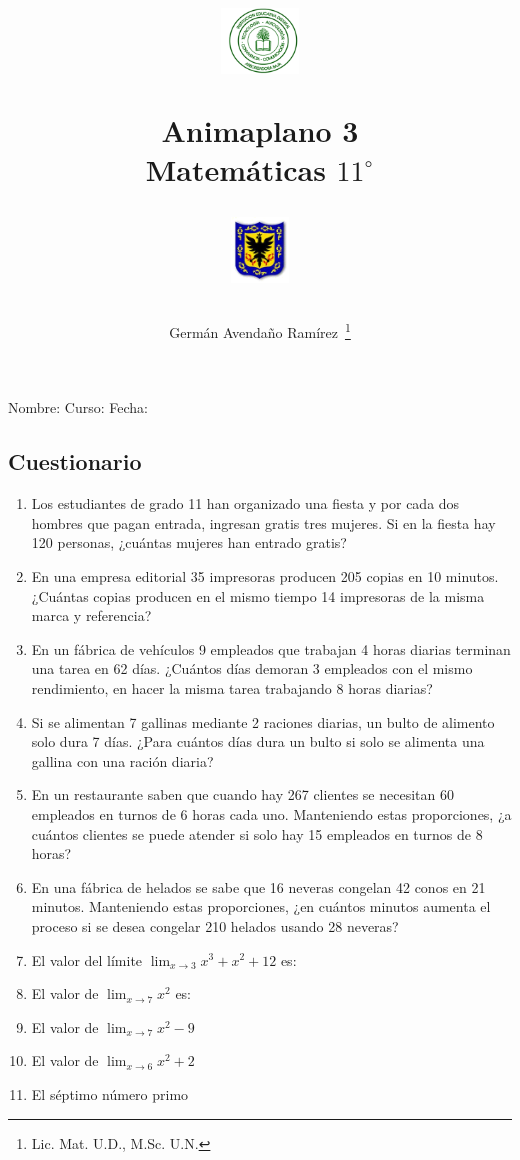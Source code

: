 \documentclass[letterpaper,11pt,twoside]{article}
\author{Germ\'an Avenda\~no Ram\'irez~\thanks{Lic. Mat. U.D., M.Sc. U.N.}}
\title{\begin{minipage}{.2\textwidth}
\includegraphics[height=1.75cm]{Images/logo-colegio.png}\end{minipage}
\begin{minipage}{.55\textwidth}
\begin{center}
Animaplano 3\\
Matemáticas $11^{\circ}$
\end{center}
\end{minipage}\hfill
\begin{minipage}{.2\textwidth}
\includegraphics[height=1.75cm]{Images/logo-sed.png} 
\end{minipage}}
\date{}
\begin{document}
\maketitle
Nombre: \hrulefill Curso: \underline{\hspace*{44pt}} Fecha: \underline{\hspace*{2.5cm}}
\begin{multicols}{2}
\section*{Cuestionario}
\begin{enumerate}
\item Los estudiantes de grado 11 han organizado una fiesta y por cada dos hombres que pagan entrada, ingresan gratis tres mujeres. Si en la fiesta hay 120 personas, ¿cuántas mujeres han entrado gratis?
\item En una empresa editorial 35 impresoras producen 205 copias en 10 minutos. ¿Cuántas copias producen en el mismo tiempo 14 impresoras de la misma marca y referencia?
\item En un fábrica de vehículos 9 empleados que trabajan 4 horas diarias terminan una tarea en 62 días. ¿Cuántos días demoran 3 empleados con el mismo rendimiento, en hacer la misma tarea trabajando 8 horas diarias?
\item Si se alimentan 7 gallinas mediante 2 raciones diarias, un bulto de alimento solo dura 7 días. ¿Para cuántos días dura un bulto si solo se alimenta una gallina con una ración diaria?
\item En un restaurante saben que cuando hay 267 clientes se necesitan 60 empleados en turnos de 6 horas cada uno. Manteniendo estas proporciones, ¿a cuántos clientes se puede atender si solo hay 15 empleados en turnos de 8 horas?
\item En una fábrica de helados se sabe que 16 neveras congelan 42 conos en 21 minutos. Manteniendo estas proporciones, ¿en cuántos minutos aumenta el proceso si se desea congelar 210 helados usando 28 neveras?
\item El valor del límite $\displaystyle{\lim_{x\rightarrow 3}x^{3}+x^{2}+12}$ es:
\item El valor de $\displaystyle{\lim_{x\rightarrow 7}x^{2}}$ es:
\item El valor de $\displaystyle{\lim_{x\rightarrow 7}x^{2}-9}$
\item El valor de $\displaystyle{\lim_{x\rightarrow 6}x^{2}+2}$
\item El séptimo número primo

\end{enumerate}
\end{multicols}
\end{document}
